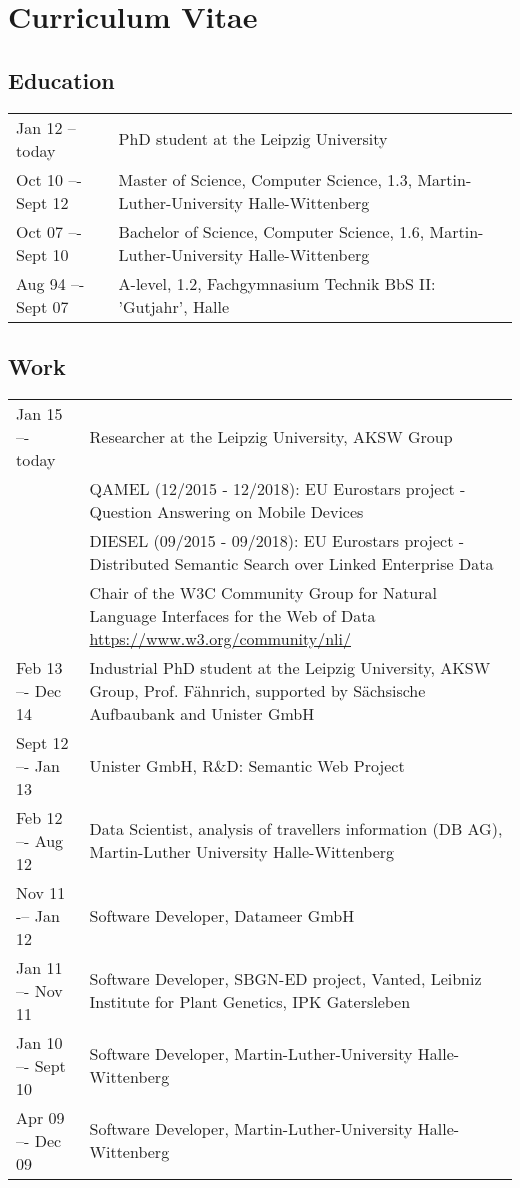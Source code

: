 \chapter{Curriculum Vitae}

\section*{Education}
\begin{tabular}{p{3cm}p{10cm}}	
Jan 12 -- today		&  	PhD student at the Leipzig University\\
Oct 10 –- Sept 12		&  	Master of Science, Computer Science, 1.3, Martin-Luther-University Halle-Wittenberg\\
Oct 07 –- Sept 10		&  	Bachelor of Science, Computer Science, 1.6, Martin-Luther-University Halle-Wittenberg\\
Aug 94 –- Sept 07		&  	A-level, 1.2, Fachgymnasium Technik BbS II: 'Gutjahr', Halle\\
\end{tabular}

\section*{Work}
\begin{tabular}{p{3cm}p{10cm}}	
Jan 15 –- today      & Researcher at the Leipzig University, AKSW Group \\
& {QAMEL} (12/2015 - 12/2018): EU Eurostars project - Question Answering on Mobile Devices\\
& {DIESEL} (09/2015 - 09/2018): EU Eurostars project - Distributed Semantic Search over Linked Enterprise Data\\
& {Chair} of the W3C Community Group for Natural Language Interfaces for the Web of Data \url{https://www.w3.org/community/nli/}\\
Feb 13 –- Dec 14     & Industrial PhD student at the Leipzig University, AKSW Group, Prof. Fähnrich, supported by Sächsische Aufbaubank and Unister GmbH\\
Sept 12 –- Jan 13    & Unister GmbH, R\&D: Semantic Web Project\\
Feb 12 –- Aug 12	    & Data Scientist, analysis of travellers information (DB AG), Martin-Luther University Halle-Wittenberg\\
Nov 11 -– Jan 12	    & Software Developer, Datameer GmbH\\
Jan 11 –- Nov 11	    & Software Developer, SBGN-ED project, Vanted, Leibniz Institute for Plant Genetics, IPK Gatersleben\\
Jan 10 –- Sept 10	& Software Developer, Martin-Luther-University Halle-Wittenberg\\
Apr 09 –- Dec 09	& Software Developer, Martin-Luther-University Halle-Wittenberg\\
\end{tabular}

